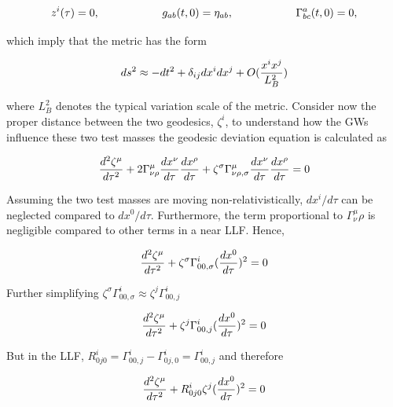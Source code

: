 \documentclass[binding=0.6cm, LaM]{sapthesis}
\begin{document}
		\begin{equation}
		z^i(\tau) = 0, \hspace*{2cm} g_{ab}(t, 0) = \eta_{ab}, \hspace*{2cm} \Gamma^a_{bc}(t,0) = 0,
		\end{equation}

	which imply that the metric has the form

		\begin{equation}
		ds^2 \approx -dt^2 + \delta_{ij}dx^i dx^j + O({{x^ix^j}\over{L^2_B}})
		\end{equation}

	where $L^2_B$ denotes the typical variation scale of the metric.
	Consider now the proper distance between the two geodesics, $\zeta^i$, 
	to understand how the GWs influence these two test masses the geodesic deviation equation is calculated as

		\begin{equation}
		{{d^2\zeta^{\mu}}\over{d\tau^2}} + 2\Gamma^{\mu}_{\nu\rho}{{dx^{\nu}}\over{d\tau}}{{dx^\rho}\over{d\tau}} + \zeta^{\sigma}\Gamma^{\mu}_{\nu\rho,\sigma}{{dx^{\nu}}\over{d\tau}}{{dx^{\rho}}\over{d\tau}} = 0
		\end{equation}

	Assuming the two test masses are moving non-relativistically, $dx^i/d\tau$ can be neglected compared to $dx^0/d\tau$.
	Furthermore, the term proportional to $\Gamma^{\mu}_\nu\rho{}$ is negligible compared to other terms in a near LLF. Hence,

		\begin{equation}
		{{d^2\zeta^{\mu}}\over{d\tau^2}} + \zeta^{\sigma}\Gamma^{i}_{00, \sigma}({{dx^0}\over{d\tau}})^2 = 0
		\end{equation}

	Further simplifying $\zeta^{\sigma}\Gamma^{i}_{00, \sigma} \approx \zeta^{j}\Gamma^{i}_{00, j}$

		\begin{equation}
		{{d^2\zeta^{\mu}}\over{d\tau^2}} + \zeta^{j}\Gamma^{i}_{00,j}({{dx^0}\over{d\tau}})^2 = 0
		\end{equation}

	But in the LLF, $R^i_{0j0} = \Gamma^i_{00,j} - \Gamma^i_{0j,0} = \Gamma^i_{00,j}$ and therefore

		\begin{equation}
		{{d^2\zeta^{\mu}}\over{d\tau^2}} + R^i_{0j0} \zeta^j({{dx^0}\over{d\tau}})^2 = 0
		\end{equation}
\end{document}
